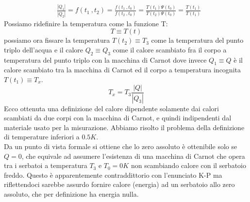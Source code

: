 \documentclass[10pt,a4paper]{article}
\begin{document}
\begin{align*}
&\frac{|Q_1|}{|Q_2|} = f(t_1\ , t_2) = \frac{f(t_1\ ,t_0)}{f(t_2\ ,t_0)}= \frac{T(t_1)\Psi(t_0)}{T(t_2)\Psi(t_0)}=\frac{T(t_1)}{T(t_1)}
\end{align*}
Possiamo ridefinire la temperatura come la funzione T: \[T \equiv T(t)\]
possiamo ora fissare la temperatura $T(t_2)\equiv T_3$ come la temperatura del punto triplo dell'acqua e il calore \(Q_2\equiv Q_3\) come il calore scambiato fra il corpo a temperatura del punto triplo con la macchina di Carnot dove invece \(Q_1\equiv Q\) è il calore scambiato tra la macchina di Carnot ed il corpo a temperatura incognita \(T(t_1)\equiv T_x\). 
\[T_x = T_3\frac{|Q|}{|Q_3|}\]
Ecco ottenuta una definizione del calore dipendente solamente dai calori scambiati da due corpi con la macchina di Carnot, e quindi indipendenti dal materiale usato per la misurazione. Abbiamo risolto il problema della definizione di temperature inferiori a \(0.5 K\).\\
Da un punto di vista formale si ottiene che lo zero assoluto è ottenibile solo se \(Q = 0\), che equivale ad assumere l'esistenza di una macchina di Carnot che opera tra i serbatoi a temperatura \(T_3\) e \(T_0 = 0K\) non scambiando calore con il serbatoio freddo. Questo è apparentemente contraddittorio con l'enunciato K-P ma riflettendoci sarebbe assurdo fornire calore (energia) ad un serbatoio allo zero assoluto, che per definizione ha energia nulla. 
\end{document}
